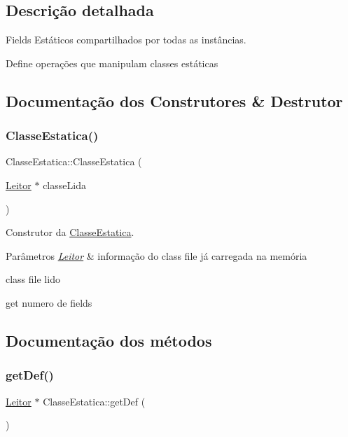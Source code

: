 \subsection{Descrição detalhada}
Fields Estáticos compartilhados por todas as instâncias. 

Define operações que manipulam classes estáticas 

\subsection{Documentação dos Construtores \& Destrutor}
\mbox{\label{classClasseEstatica_a4e584d8a91a0f7c5ce9a64a78bbb1f50}} 
\subsubsection{\texorpdfstring{Classe\+Estatica()}{ClasseEstatica()}}
{\footnotesize\ttfamily Classe\+Estatica\+::\+Classe\+Estatica (\begin{DoxyParamCaption}\item[{\hyperlink{classLeitor}{Leitor} $\ast$}]{classe\+Lida }\end{DoxyParamCaption})}



Construtor da \hyperlink{classClasseEstatica}{Classe\+Estatica}. 


\begin{DoxyParams}{Parâmetros}
{\em \hyperlink{classLeitor}{Leitor}} & informação do class file já carregada na memória \\
\hline
\end{DoxyParams}
class file lido

get numero de fields 

\subsection{Documentação dos métodos}
\mbox{\label{classClasseEstatica_a5cf4c48a80b40143af26acde5f802776}} 
\subsubsection{\texorpdfstring{get\+Def()}{getDef()}}
{\footnotesize\ttfamily \hyperlink{classLeitor}{Leitor} $\ast$ Classe\+Estatica\+::get\+Def (\begin{DoxyParamCaption}{ }\end{DoxyParamCaption})}



